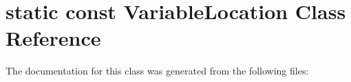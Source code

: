 \hypertarget{classstatic_01const_01VariableLocation}{}\section{static const Variable\+Location Class Reference}
\label{classstatic_01const_01VariableLocation}


The documentation for this class was generated from the following files\+: